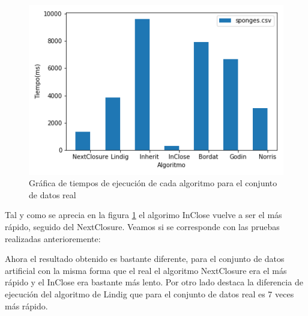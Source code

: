 \documentclass[oneside,openright,titlepage,numbers=noenddot,openany,headinclude,footinclude=true,
cleardoublepage=empty,abstractoff,BCOR=5mm,paper=a4,fontsize=12pt,main=spanish]{scrreprt}
\begin{document}
\begin{itemize}
\begin{figure}[H]
  \centering
  \includegraphics[scale=0.6]{images/total-sponges.png}
  
\caption{Gráfica de tiempos de ejecución de cada algoritmo para el conjunto de datos real }
\label{fig:totalsponges}
\end{figure}
 Tal y como se aprecia en la figura \ref{fig:totalsponges} el algorimo InClose vuelve a ser el más rápido, seguido del NextClosure. Veamos si se corresponde con las pruebas realizadas anterioremente:
\begin{table}[H]
    \centering
    \caption{Tabla comparativa de tiempos de ejecución en ms para el conjunto de datos de esponjas.}
\end{table}

Ahora el resultado obtenido es bastante diferente, para el conjunto de datos artificial con la misma forma que el real el algoritmo NextClosure era el más rápido y el InClose era bastante más lento. Por otro lado destaca la diferencia de ejecución del algoritmo de Lindig que para el conjunto de datos real es 7 veces más rápido.


\end{itemize}
\end{document}
